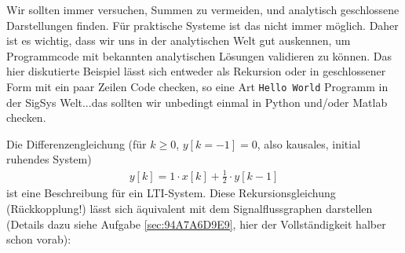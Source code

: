 \begin{ExCalc}
Wir sollten immer versuchen, Summen zu vermeiden, und analytisch geschlossene
Darstellungen finden. Für praktische Systeme ist das nicht immer möglich.
Daher ist es wichtig, dass wir uns in der analytischen Welt gut auskennen, um
Programmcode mit bekannten analytischen Lösungen validieren zu können.
%
Das hier diskutierte Beispiel lässt sich entweder als Rekursion oder in geschlossener
Form mit ein paar Zeilen Code checken, so eine Art \texttt{Hello World} Programm
in der SigSys Welt...das sollten wir unbedingt einmal in Python und/oder Matlab checken.
\end{ExCalc}
\begin{Loesung}
Die Differenzengleichung (für $k\geq 0$, $y[k=-1]=0$, also kausales, initial ruhendes System)
\begin{align}
y[k] = 1 \cdot x[k] + \frac{1}{2} \cdot y[k-1]
\end{align}
ist eine Beschreibung für ein LTI-System. Diese Rekursionsgleichung (Rückkopplung!)
lässt sich äquivalent mit dem Signalflussgraphen darstellen
(Details dazu siehe Aufgabe \ref{sec:94A7A6D9E9}, hier der Vollständigkeit halber
schon vorab):
%
\begin{center}
\end{center}
%


\end{Loesung}
